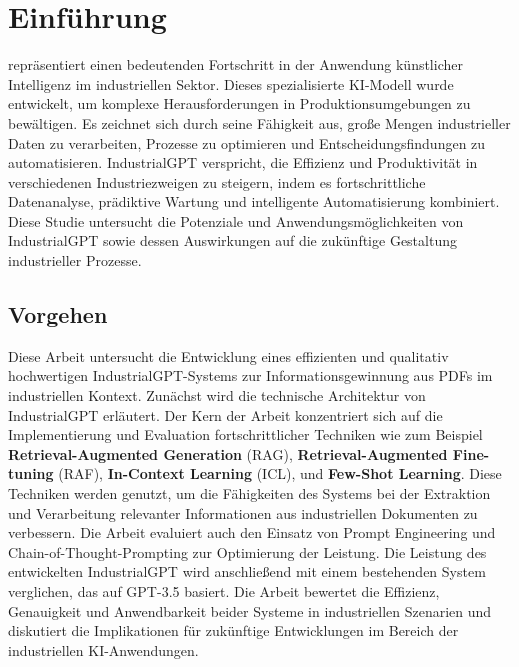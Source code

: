 \section{Einführung}
\label{sec:introduction}
 repräsentiert einen bedeutenden Fortschritt in der Anwendung künstlicher Intelligenz im industriellen Sektor.
Dieses spezialisierte KI-Modell wurde entwickelt, um komplexe Herausforderungen in Produktionsumgebungen zu bewältigen.
Es zeichnet sich durch seine Fähigkeit aus, große Mengen industrieller Daten zu verarbeiten, Prozesse zu optimieren und Entscheidungsfindungen zu automatisieren.
IndustrialGPT verspricht, die Effizienz und Produktivität in verschiedenen Industriezweigen zu steigern, indem es fortschrittliche Datenanalyse, prädiktive Wartung und intelligente Automatisierung kombiniert.
Diese Studie untersucht die Potenziale und Anwendungsmöglichkeiten von IndustrialGPT sowie dessen Auswirkungen auf die zukünftige Gestaltung industrieller Prozesse.

\subsection{Vorgehen}
\label{subsec:approach}

Diese Arbeit untersucht die Entwicklung eines effizienten und qualitativ hochwertigen IndustrialGPT-Systems zur Informationsgewinnung aus PDFs im industriellen Kontext.
Zunächst wird die technische Architektur von IndustrialGPT erläutert.
Der Kern der Arbeit konzentriert sich auf die Implementierung und Evaluation fortschrittlicher Techniken wie zum Beispiel \textbf{Retrieval-Augmented Generation} (RAG), \textbf{Retrieval-Augmented Fine-tuning} (RAF), \textbf{In-Context Learning} (ICL), und \textbf{Few-Shot Learning}.
Diese Techniken werden genutzt, um die Fähigkeiten des Systems bei der Extraktion und Verarbeitung relevanter Informationen aus industriellen Dokumenten zu verbessern.
Die Arbeit evaluiert auch den Einsatz von Prompt Engineering und Chain-of-Thought-Prompting zur Optimierung der Leistung.
Die Leistung des entwickelten IndustrialGPT wird anschließend mit einem bestehenden System verglichen, das auf GPT-3.5 basiert.
Die Arbeit bewertet die Effizienz, Genauigkeit und Anwendbarkeit beider Systeme in industriellen Szenarien und diskutiert die Implikationen für zukünftige Entwicklungen im Bereich der industriellen KI-Anwendungen.
